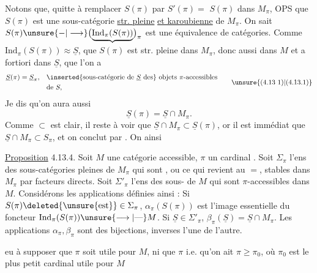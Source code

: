 Notons que, quitte à remplacer
$S(\pi)$ par $S'(\pi)=$  $S(\pi)$
dans $M_\pi$, OPS que $S(\pi)$ est une
sous-catégorie \uline{str. pleine} \uline{et karoubienne}
de $M_\pi$. On sait 
$S(\pi)\unsure{-|\longrightarrow}\bigl(\underbrace{\mathrm{Ind}_\pi(S(\pi))}\bigr)_\pi$ est une équivalence
de catégories. Comme $\mathrm{Ind}_\pi(S(\pi))\approx\underline S$,
 que $S(\pi)$ est str. pleine dans
$M_\pi$, donc aussi dans $M$ et a fortiori
dans $\underline S$, que l'on a
\[
 \begin{aligned}
 \underline S(\pi)=\underline S_\pi,\quad&
 \inserted{\text{sous-catégorie de }\underline S\text{ des}}\ \text{objets }\pi\text{-accessibles}\\
 &\text{de }S,
 \end{aligned}
 \tag*{\unsure{(4.13 1)|(4.13.1)}}
\]
Je dis qu'on aura aussi
\[
 \underline S(\pi)=\underline S\cap M_\pi.\tag*{(4.13.1)}
\]
Comme $\subset$ est clair, il reste à voir
que $\underline S\cap M_\pi\subset\underline S(\pi)$, or il est
immédiat que $\underline S\cap M_\pi\subset S_\pi$, et
on conclut par . On 
ainsi\unsure{:}

\uline{Proposition} 4.13.4. Soit $M$ une
catégorie accessible,  $\pi$ un
cardinal . Soit $\Sigma_\pi$ l'ens des
sous-catégories  pleines  de $M_\pi$
qui sont , ou ce qui
revient au $=$, stables  dans $M_\pi$ par
facteurs directs. Soit $\Sigma'_\pi$ l'ens
des sous- de $M$ qui sont
$\pi$-accessibles dans $M$. Considérons
les applications
définies ainsi : Si $S(\pi)\deleted{\text{\unsure{est}}}\in\Sigma_\pi$,
$\alpha_\pi(S(\pi))$ est l'image essentielle du
foncteur  $\mathrm{Ind}_\pi(S(\pi))\unsure{\longrightarrow|\text{---}} M$.
Si $\underline S\in\Sigma'_\pi$, $\beta_\pi(\underline S)=\underline S\cap M_\pi$.
Les applications $\alpha_\pi,\beta_\pi$ sont des
bijections, inverses l'une de
l'autre. 

  eu à supposer que
$\pi$ soit utile pour $M$, ni que $\pi$
 
i.e. qu'on ait $\pi\geq\pi_0$, où
$\pi_0$ est le plus petit cardinal utile pour $M$
